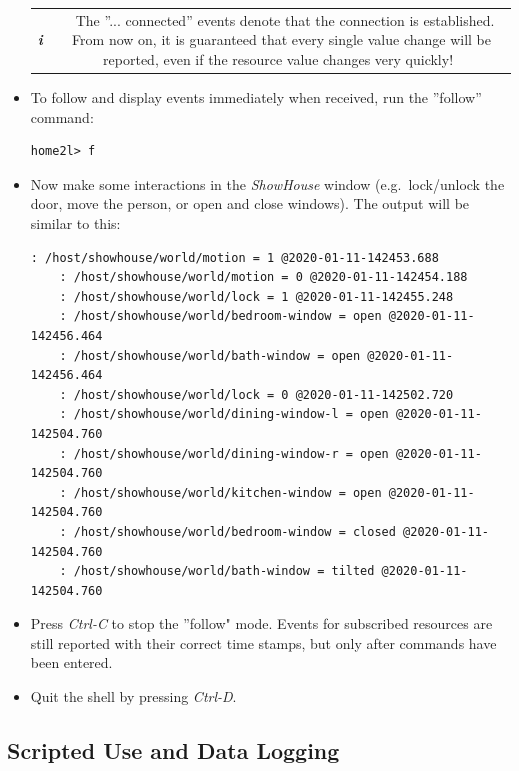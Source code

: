 \documentclass[12pt,english,parskip=half,headheight=19pt]{scrreprt}
\newcommand{\infobox}[1]{
  \par
  \medskip
  \hfill
  \setlength\arrayrulewidth{1pt}
  \begin{tabular}[t]{c|c|}
    \parbox{1.8em}{\hfill\textit{\Huge\textbf{i}\,}}
    &
    \,\parbox{0.89\linewidth}{\setlength{\parskip}{0.5em} \small #1}\,
  \end{tabular}
  \medskip
  \par
}
\begin{document}
\begin{itemize}[$\blacktriangleright$]
  \infobox{
    The ''... connected'' events denote that the connection is established.
    From now on, it is guaranteed that every single value change will be reported,
    even if the resource value changes very quickly!
  }

\item
  To follow and display events immediately when received, run the ''follow'' command:
  \begin{lstlisting}[language=home2l]
    home2l> f
  \end{lstlisting}

\item
  Now make some interactions in the \textit{ShowHouse} window
  (e.g.~lock/unlock the door, move the person, or open and close windows).
  The output will be similar to this:
  \begin{lstlisting}[language=home2l]
    : /host/showhouse/world/motion = 1 @2020-01-11-142453.688
    : /host/showhouse/world/motion = 0 @2020-01-11-142454.188
    : /host/showhouse/world/lock = 1 @2020-01-11-142455.248
    : /host/showhouse/world/bedroom-window = open @2020-01-11-142456.464
    : /host/showhouse/world/bath-window = open @2020-01-11-142456.464
    : /host/showhouse/world/lock = 0 @2020-01-11-142502.720
    : /host/showhouse/world/dining-window-l = open @2020-01-11-142504.760
    : /host/showhouse/world/dining-window-r = open @2020-01-11-142504.760
    : /host/showhouse/world/kitchen-window = open @2020-01-11-142504.760
    : /host/showhouse/world/bedroom-window = closed @2020-01-11-142504.760
    : /host/showhouse/world/bath-window = tilted @2020-01-11-142504.760
  \end{lstlisting}

\item
  Press \textit{Ctrl-C} to stop the ''follow" mode. Events for subscribed resources
  are still reported with their correct time stamps, but only after
  commands have been entered.

\item
  Quit the shell by pressing \textit{Ctrl-D}.

\end{itemize}





\subsection{Scripted Use and Data Logging}
\label{sec:tutorial-shell-scripting}
\end{document}
